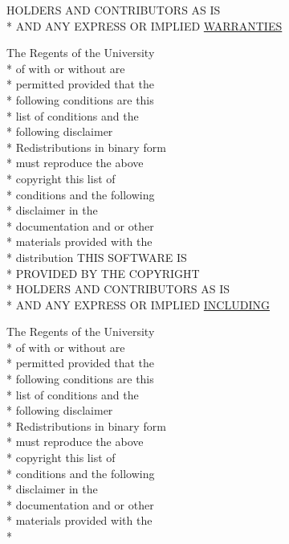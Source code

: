 \begin{DoxyCompactItemize}
H\+O\+L\+D\+E\+R\+S A\+N\+D C\+O\+N\+T\+R\+I\+B\+U\+T\+O\+R\+S A\+S I\+S \\*
A\+N\+D A\+N\+Y E\+X\+P\+R\+E\+S\+S O\+R I\+M\+P\+L\+I\+E\+D \hyperlink{_l_i_c_e_n_s_e_a3f8645b457d8bdef4fd7c3549fc01039}{W\+A\+R\+R\+A\+N\+T\+I\+E\+S}
\item 
The Regents of the University \\*
of with or without are \\*
permitted provided that the \\*
following conditions are this \\*
list of conditions and the \\*
following disclaimer \\*
Redistributions in binary form \\*
must reproduce the above \\*
copyright this list of \\*
conditions and the following \\*
disclaimer in the \\*
documentation and or other \\*
materials provided with the \\*
distribution T\+H\+I\+S S\+O\+F\+T\+W\+A\+R\+E I\+S \\*
P\+R\+O\+V\+I\+D\+E\+D B\+Y T\+H\+E C\+O\+P\+Y\+R\+I\+G\+H\+T \\*
H\+O\+L\+D\+E\+R\+S A\+N\+D C\+O\+N\+T\+R\+I\+B\+U\+T\+O\+R\+S A\+S I\+S \\*
A\+N\+D A\+N\+Y E\+X\+P\+R\+E\+S\+S O\+R I\+M\+P\+L\+I\+E\+D \hyperlink{_l_i_c_e_n_s_e_a4cc4ede62f5367a5ba66dc92278c86dc}{I\+N\+C\+L\+U\+D\+I\+N\+G}
\item 
The Regents of the University \\*
of with or without are \\*
permitted provided that the \\*
following conditions are this \\*
list of conditions and the \\*
following disclaimer \\*
Redistributions in binary form \\*
must reproduce the above \\*
copyright this list of \\*
conditions and the following \\*
disclaimer in the \\*
documentation and or other \\*
materials provided with the \\*

\end{DoxyCompactItemize}
